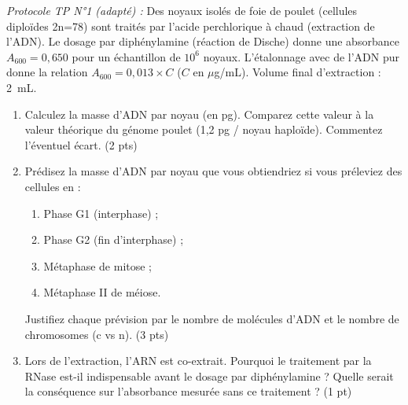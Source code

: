 \documentclass[11pt]{article}
\begin{document}
\begin{exercice}
\emph{Protocole TP N°1 (adapté) :} Des noyaux isolés de foie de poulet (cellules diploïdes 2n=78) sont traités par l'acide perchlorique à chaud (extraction de l'ADN). Le dosage par diphénylamine (réaction de Dische) donne une absorbance $A_{600}=0,650$ pour un échantillon de $10^6$ noyaux. L'étalonnage avec de l'ADN pur donne la relation $A_{600} = 0,013 \times C$ ($C$ en $\mu$g/mL). Volume final d'extraction : \SI{2}{\milli\liter}.

\begin{enumerate}
    \item Calculez la masse d'ADN par noyau (en pg). Comparez cette valeur à la valeur théorique du génome poulet (1,2 pg / noyau haploïde). Commentez l'éventuel écart. \hfill (2 pts)
    \item Prédisez la masse d'ADN par noyau que vous obtiendriez si vous préleviez des cellules en : 
    \begin{enumerate}
        \item Phase G1 (interphase) ;
        \item Phase G2 (fin d'interphase) ;
        \item Métaphase de mitose ;
        \item Métaphase II de méiose.
    \end{enumerate}
    Justifiez chaque prévision par le nombre de molécules d'ADN et le nombre de chromosomes (c vs n). \hfill (3 pts)
    \item Lors de l'extraction, l'ARN est co-extrait. Pourquoi le traitement par la RNase est-il indispensable avant le dosage par diphénylamine ? Quelle serait la conséquence sur l'absorbance mesurée sans ce traitement ? \hfill (1 pt)
\end{enumerate}
\end{exercice}
\end{document}

